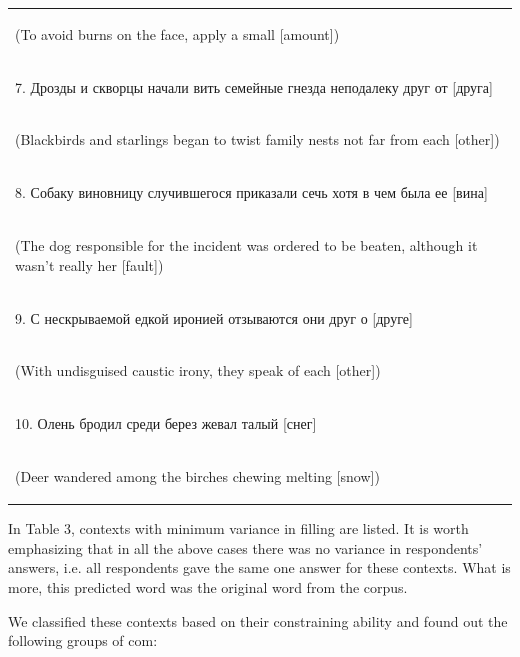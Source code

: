 \documentclass[a4paper]{article}
\begin{document}
\begin{table}
\begin{tabular}{l}
\begin{english} (To avoid burns on the face, apply a small [amount])\end{english} \\
\begin{russian} 7. Дрозды и скворцы начали вить семейные гнезда неподалеку друг от [друга]\end{russian} \\
\begin{english} (Blackbirds and starlings began to twist family nests not far from each [other])\end{english} \\
\begin{russian} 8. Собаку виновницу случившегося приказали сечь хотя в чем была ее [вина]\end{russian} \\
\begin{english} (The dog responsible for the incident was ordered to be beaten, although it wasn't really her [fault])\end{english} \\
\begin{russian} 9. С нескрываемой едкой иронией отзываются они друг о [друге]\end{russian} \\
\begin{english} (With undisguised caustic irony, they speak of each [other])\end{english} \\
\begin{russian} 10. Олень бродил среди берез жевал талый [снег]\end{russian} \\
\begin{english} (Deer wandered among the birches chewing melting [snow])\end{english} \\
\end{tabular}
\end{table}

In Table 3, contexts with minimum variance in filling
are listed. It is worth emphasizing that in all the above cases there was no variance in respondents’ answers, i.e. all respondents gave the same one answer for these contexts. What is more, this predicted word was the original word from the corpus.

We classified these contexts based on their constraining ability and found out the following groups of com:
\newline
\end{document}
